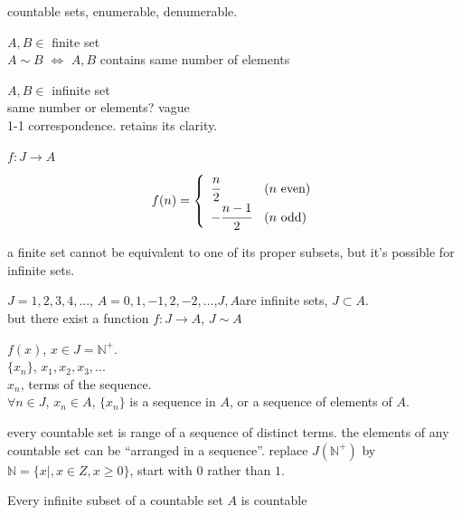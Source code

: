 countable sets, enumerable, denumerable.

$A, B \in$ finite set\\
$A\sim B$ $\Longleftrightarrow$ $A, B$ contains same number of elements

$A, B \in$ infinite set\\
same number or elements? vague\\
1-1 correspondence. retains its clarity.

\begin{newexample}
    $f:J\rightarrow A$
    \begin{equation*}
        f(n) = \left\{
            \begin{array}{ll}
                \cfrac{n}{2} & (n \text{  even})\\
                -\cfrac{n-1}{2} & (n \text{  odd})
            \end{array}
        \right.
    \end{equation*}
\end{newexample}

\begin{myRemark}
    a finite set cannot be equivalent to one of its proper subsets, but it's possible for infinite sets.
\end{myRemark}

$J = 1,2,3,4,...$, $A = 0,1,-1,2,-2,...$,$J, A$are infinite sets, $J \subset A$.\\
but there exist a function $f:J\rightarrow A$, $J \sim A$

\begin{mydef}
    \label{mydef:2.7}
    $f(x)$, $x\in J = \mathbb{N}^+$.\\
    $\{x_n\}$, $x_1,x_2,x_3,...$\\
    $x_n$, terms of the sequence.\\
    $\forall n\in J$, $x_n\in A$, $\{x_n\}$ is a sequence in $A$, or a sequence of elements of $A$.
\end{mydef}

every countable set is range of a sequence of distinct terms.
the elements of any countable set can be ``arranged in a sequence''.
replace $J(\mathbb{N}^+)$ by $\mathbb{N} = \{x|, x\in Z,x \geq 0\}$, start with $0$ rather than $1$.

\begin{thm}
    \label{thm:2.8}
    Every infinite subset of a countable set $A$ is countable
\end{thm}

